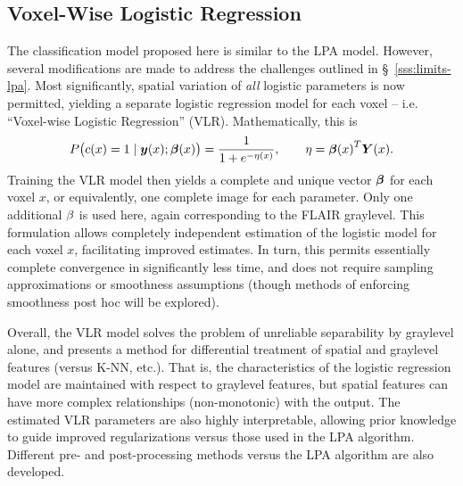 \subsection{Voxel-Wise Logistic Regression}\label{ss:intro-vlr}
The classification model proposed here is similar to the LPA model.
However, several modifications are made
to address the challenges outlined in \S~\ref{sss:limits-lpa}.
Most significantly, spatial variation of \textit{all} logistic parameters is now permitted,
yielding a separate logistic regression model for each voxel
-- i.e. ``Voxel-wise Logistic Regression'' (VLR).
Mathematically, this is
\begin{equation}
  P\big(c(x)=1\mid\by(x);\bb(x)\big) = \frac{1}{1+e^{-\eta(x)}},\qquad\eta = {\bb(x)}^T\bm{Y}(x).%
  \label{eq:eq:vlrmodel-intro}
\end{equation}
Training the VLR model then yields a complete and unique vector $\bm{\beta}$ for each voxel $x$,
or equivalently, one complete image for each parameter.
Only one additional $\beta$ is used here, again corresponding to the FLAIR graylevel.
This formulation allows completely independent estimation of the logistic model for each voxel $x$,
facilitating improved estimates.
In turn, this permits essentially complete convergence in significantly less time,
and does not require sampling approximations or smoothness assumptions
(though methods of enforcing smoothness post hoc will be explored).
\par
Overall, the VLR model solves the problem of unreliable separability by graylevel alone,
and presents a method for differential treatment of spatial and graylevel features
(versus K-NN, etc.).
That is, the characteristics of the logistic regression model
are maintained with respect to graylevel features,
but spatial features can have more complex relationships (non-monotonic) with the output.
The estimated VLR parameters are also highly interpretable,
allowing prior knowledge to guide improved regularizations versus those used in the LPA algorithm.
Different pre- and post-processing methods versus the LPA algorithm are also developed.
